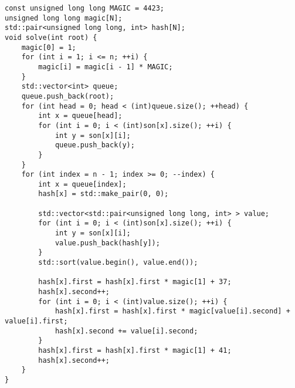 \begin{lstlisting}
const unsigned long long MAGIC = 4423;
unsigned long long magic[N];
std::pair<unsigned long long, int> hash[N];
void solve(int root) {
    magic[0] = 1;
    for (int i = 1; i <= n; ++i) {
        magic[i] = magic[i - 1] * MAGIC;
    }
    std::vector<int> queue;
    queue.push_back(root);
    for (int head = 0; head < (int)queue.size(); ++head) {
        int x = queue[head];
        for (int i = 0; i < (int)son[x].size(); ++i) {
            int y = son[x][i];
            queue.push_back(y);
        }
    }
    for (int index = n - 1; index >= 0; --index) {
        int x = queue[index];
        hash[x] = std::make_pair(0, 0);

        std::vector<std::pair<unsigned long long, int> > value;
        for (int i = 0; i < (int)son[x].size(); ++i) {
            int y = son[x][i];
            value.push_back(hash[y]);
        }
        std::sort(value.begin(), value.end());
        
        hash[x].first = hash[x].first * magic[1] + 37;
        hash[x].second++;
        for (int i = 0; i < (int)value.size(); ++i) {
            hash[x].first = hash[x].first * magic[value[i].second] + value[i].first;
            hash[x].second += value[i].second;
        }
        hash[x].first = hash[x].first * magic[1] + 41;
        hash[x].second++;
    }
}
\end{lstlisting}
